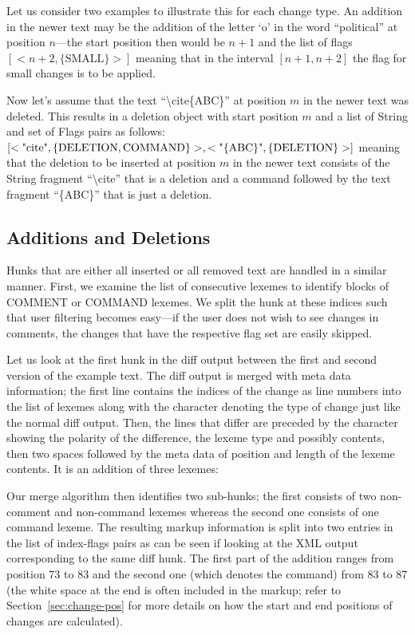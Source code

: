 Let us consider two examples to illustrate this for each change type.  An addition in the newer text may be the addition of the letter `o' in the word ``political'' at position $n$---the start position then would be $n+1$ and the list of flags $[<n+2, \{\text{SMALL}\}>]$ meaning that in the interval $[n+1, n+2]$ the flag for small changes is to be applied.

Now let's assume that the text ``\textbackslash cite\{ABC\}'' at position $m$ in the newer text was deleted.  This results in a deletion object with start position $m$ and a list of String and set of Flags pairs as follows: $[<\text{\textquotedbl\\cite\textquotedbl},\{\text{DELETION},\text{COMMAND}\}>,<\text{\textquotedbl\{ABC\}\textquotedbl},\{\text{DELETION}\}>]$ meaning that the deletion to be inserted at position $m$ in the newer text consists of the String fragment ``\textbackslash cite'' that is a deletion and a command followed by the text fragment ``\{ABC\}'' that is just a deletion.

\subsection{Additions and Deletions}

Hunks that are either all inserted or all removed text are handled in a similar manner.  First, we examine the list of consecutive lexemes to identify blocks of COMMENT or COMMAND lexemes.  We split the hunk at these indices such that user filtering becomes easy---if the user does not wish to see changes in comments, the changes that have the respective flag set are easily skipped.

Let us look at the first hunk in the diff output between the first and second version of the example text.  The diff output is merged with meta data information; the first line contains the indices of the change as line numbers into the list of lexemes along with the character denoting the type of change just like the normal diff output.  Then, the lines that differ are preceded by the character showing the polarity of the difference, the lexeme type and possibly contents, then two spaces followed by the meta data of position and length of the lexeme contents.  It is an addition of three lexemes:


Our merge algorithm then identifies two sub-hunks; the first consists of two non-comment and non-command lexemes whereas the second one consists of one command lexeme.  The resulting markup information is split into two entries in the list of index-flags pairs as can be seen if looking at the XML output corresponding to the same diff hunk. The first part of the addition ranges from position 73 to 83 and the second one (which denotes the command) from 83 to 87 (the white space at the end is often included in the markup; refer to Section~\ref{sec:change-pos} for more details on how the start and end positions of changes are calculated).

